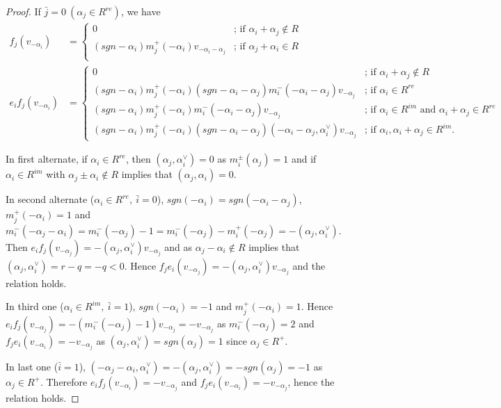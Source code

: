 \documentclass[11pt]{amsart}
\theoremstyle{plain}
\theoremstyle{definition}
\numberwithin{equation}{section}
\newcommand{\al}{\alpha}
\begin{document}
\begin{proof}
		\noindent
		If $\bar{j}=0~(\al_j\in R^{re})$, we have
		\begin{align*}
			f_j(v_{-\alpha_i})&=\begin{cases}
				0&\text{; if }\al_i+\al_j\notin R\\
				(sgn-\al_i)m_j^+(-\alpha_i)v_{-\al_i-\alpha_j}& \text{; if }\alpha_j+\al_i\in R\\
			\end{cases}\\
			e_if_j(v_{-\alpha_i})&=\begin{cases}
				0&\text{; if }\al_i+\al_j\notin R\\
				(sgn-\al_i)m_j^+(-\alpha_i)(sgn-\al_i-\al_j)m_i^-(-\al_i-\al_j)v_{-\alpha_j}& \text{; if }\al_i\in R^{re}\\
				(sgn-\al_i)m_j^+(-\al_i)m_i^-(-\al_i-\al_j)v_{-\al_j}&\text{; if }\al_i\in R^{im}\text{ and }\al_i+\al_j\in R^{re}\\
				(sgn-\al_i)m_j^+(-\al_i)(sgn-\al_i-\al_j)(-\al_i-\al_j,\al_i^{\vee})v_{-\al_j}&\text{; if }\al_i,\al_i+\al_j\in R^{im}.
			\end{cases}
		\end{align*}
		
		In first alternate, if $\al_i\in R^{re}$, then $(\al_j,\al_i^{\vee})=0$ as $m_i^{\pm}(\al_j)=1$ and if $\al_i\in R^{im}$ with $\al_j\pm\al_i\notin R$ implies that $(\al_j,\al_i)=0$.
		
		In second alternate ($\al_i\in R^{re},~\bar i=0$), $sgn(-\al_i)=sgn(-\al_i-\al_j)$, $m_j^+(-\al_i)=1$ and $m_i^-(-\al_j-\al_i)=m_i^-(-\al_j)-1=m_i^-(-\al_j)-m_i^+(-\al_j)=-(\al_j,\al_i^{\vee})$. Then $e_if_j(v_{-\al_j})=-(\al_j,\al_i^{\vee})v_{-\al_j}$ and as $\al_j-\al_i\notin R$ implies that $(\al_j,\al_i^{\vee})=r-q=-q<0$. Hence $f_je_i(v_{-\al_j})=-(\al_j,\al_i^{\vee})v_{-\al_j}$ and the relation holds.
		
		In third one ($\al_i\in R^{im},~\bar i=1$), $sgn(-\al_i)=-1$ and $m_j^+(-\al_i)=1$. Hence $e_if_j(v_{-\al_j})=-(m_i^-(-\al_j)-1)v_{-\al_j}=-v_{-\al_j}$ as $m_i^-({-\al_j})=2$ and $f_je_i(v_{-\al_i})=-v_{-\al_j}$ as $(\al_j,\al_i^{\vee})=sgn(\al_j)=1$ since $\al_j\in R^+$.
		
		In last one ($\bar i=1$), $(-\al_j-\al_i,\al_i^{\vee})=-(\al_j,\al_i^{\vee})=-sgn(\al_j)=-1$ as $\al_j\in R^+$. Therefore $e_if_j(v_{-\al_i})=-v_{-\al_j}$ and $f_je_i(v_{-\al_i})=-v_{-\al_j}$, hence the relation holds.
		

\end{proof}
\end{document}
